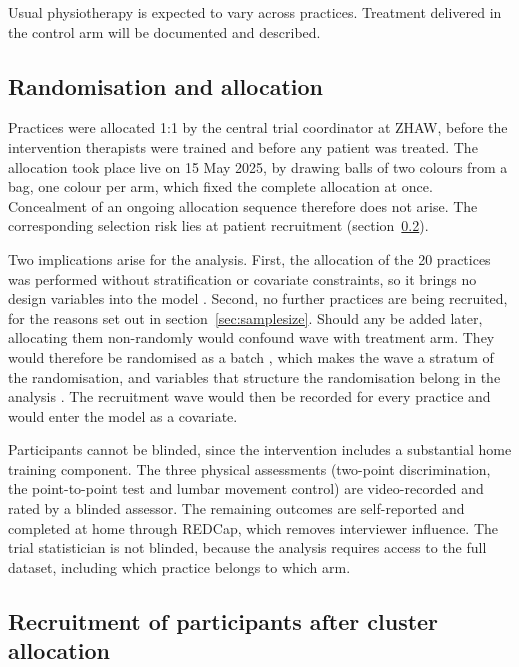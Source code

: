 \documentclass[11pt,a4paper]{article}
\begin{document}
Usual physiotherapy is expected to vary across practices. Treatment delivered
in the control arm will be documented and described.

\subsection{Randomisation and allocation}
\label{sec:randomisation}

Practices were allocated 1:1 by the central trial coordinator at ZHAW, before
the intervention therapists were trained and before any patient was treated.
The allocation took place live on 15 May 2025, by drawing balls of two colours
from a bag, one colour per arm, which fixed the complete allocation at once.
Concealment of an ongoing allocation sequence therefore does not arise. The
corresponding selection risk lies at patient recruitment
(section~\ref{sec:recruitment}).

Two implications arise for the analysis. First, the allocation of the 20
practices was performed without stratification or covariate constraints, so
it brings no design variables into the model \citep{kahan2012, hemming2023}.
Second, no further practices are being recruited, for the reasons set out in
section~\ref{sec:samplesize}. Should any be added later, allocating them
non-randomly would confound wave with treatment arm. They would therefore be
randomised as a batch \citep{ivers2012, moulton2004}, which makes the wave a
stratum of the randomisation, and variables that structure the randomisation
belong in the analysis \citep{kahan2012}. The recruitment wave would then be
recorded for every practice and would enter the model as a covariate.

Participants cannot be blinded, since the intervention includes a substantial
home training component. The three physical assessments (two-point
discrimination, the point-to-point test and lumbar movement control) are
video-recorded and rated by a blinded assessor. The remaining outcomes are
self-reported and completed at home through REDCap, which removes interviewer
influence. The trial statistician is not blinded, because the analysis
requires access to the full dataset, including which practice belongs to
which arm.

\subsection{Recruitment of participants after cluster allocation}
\label{sec:recruitment}
\end{document}

